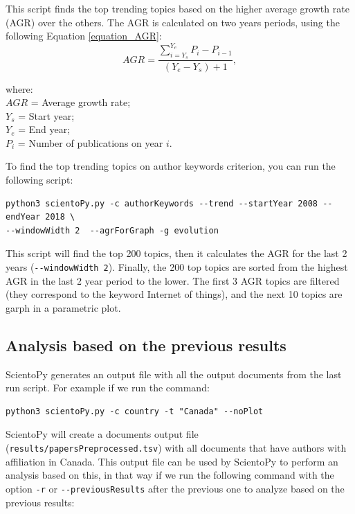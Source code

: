\documentclass[10pt,letterpaper]{article}
\begin{document}
This script finds the top trending topics based on the higher average growth rate (AGR) over the others. The AGR is calculated on two years periods, using the following Equation \eqref{equation_AGR}:
\begin{equation*}
AGR = \frac{\sum\limits_{i = Y_s}^{Y_e}P_i - P_{i-1}}{(Y_e - Y_s)+1},  
\label{equation_AGR}
\end{equation*}

\setlength{\leftskip}{5cm}
\hspace*{-1cm}where:\\
$AGR$ = Average growth rate;\\
$Y_s$ = Start year;\\
$Y_e$ = End year;\\
$P_i$ = Number of publications on year $i.$\\

\setlength{\leftskip}{0pt}

To find the top trending topics on author keywords criterion, you can run the following script: 

\begin{verbatim}
python3 scientoPy.py -c authorKeywords --trend --startYear 2008 --endYear 2018 \
--windowWidth 2  --agrForGraph -g evolution
\end{verbatim}

This script will find the top 200 topics, then it calculates the AGR for the last 2 years (\verb|--windowWidth 2|). Finally, the 200 top topics are sorted from the highest AGR in the last 2 year period to the lower. The first 3 AGR topics are filtered (they correspond to the keyword Internet of things), and the next 10 topics are garph in a parametric plot. 

\subsection{Analysis based on the previous results}

ScientoPy generates an output file with all the output documents from the last run script. For example if we run the command:

\begin{verbatim}
python3 scientoPy.py -c country -t "Canada" --noPlot
\end{verbatim}

ScientoPy will create a documents output file (\verb|results/papersPreprocessed.tsv|) with all documents that have authors with affiliation in Canada. This output file can be used by ScientoPy to perform an analysis based on this, in that way if we run the following command with the option  \verb|-r| or \verb|--previousResults| after the previous one to analyze based on the previous results:
\end{document}
